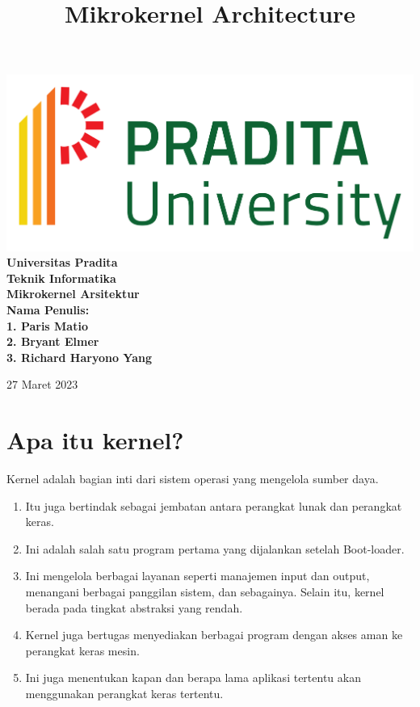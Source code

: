 \documentclass{report}
\begin{document}
	\begin{titlepage}
		\centering
		\includegraphics[scale=0.3]{logo_universitas.png}
		{\bfseries\Large
			Universitas Pradita\\
		 	Teknik Informatika\\
			\vskip2cm
			Mikrokernel Arsitektur\\
		}
		\vskip2cm
		{\bfseries\Large
			Nama Penulis:\\
		}
		\vskip0.5cm
		{\bfseries
		1. Paris Matio\\
		2. Bryant Elmer\\
		3. Richard Haryono Yang
		}
			
		\vfill
		{\large
			27 Maret 2023\\
		}
	\end{titlepage}
	
	\title{{\Huge Mikrokernel Architecture}}

	\chapter*{Apa itu kernel?}
	Kernel adalah bagian inti dari sistem operasi yang mengelola sumber daya. 
	
	\begin{enumerate}
	
	\item Itu juga bertindak sebagai jembatan antara perangkat lunak dan perangkat keras. 
	
	\item Ini adalah salah satu program pertama yang dijalankan setelah Boot-loader.
	
	\item Ini mengelola berbagai layanan seperti manajemen input dan output, menangani berbagai panggilan sistem, dan sebagainya. Selain itu, kernel berada pada tingkat abstraksi yang rendah.
	
	\item Kernel juga bertugas menyediakan berbagai program dengan akses aman ke perangkat keras mesin. 
	
	\item Ini juga menentukan kapan dan berapa lama aplikasi tertentu akan menggunakan perangkat keras tertentu.
	
	\end{enumerate}	
\end{document}
